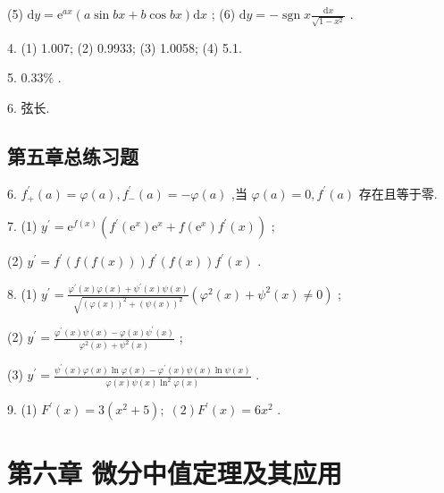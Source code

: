 (5) \(\mathrm{d}y = {\mathrm{e}}^{ax}\left( {a\sin {bx} + b\cos {bx}}\right) \mathrm{d}x\) ; (6) \(\mathrm{d}y =  - \operatorname{sgn}x\frac{\mathrm{d}x}{\sqrt{1 - {x}^{2}}}\) .

4. (1) 1.007; (2) 0.9933; (3) 1.0058; (4) 5.1.

5. \({0.33}\%\) .

6. 弦长.

\subsection{第五章总练习题}

6. \({f}_{ + }^{\prime }\left( a\right)  = \varphi \left( a\right) ,{f}_{ - }^{\prime }\left( a\right)  =  - \varphi \left( a\right)\) ,当 \(\varphi \left( a\right)  = 0,{f}^{\prime }\left( a\right)\) 存在且等于零.

7. (1) \({y}^{\prime } = {\mathrm{e}}^{f\left( x\right) }\left( {{f}^{\prime }\left( {\mathrm{e}}^{x}\right) {\mathrm{e}}^{x} + f\left( {\mathrm{e}}^{x}\right) {f}^{\prime }\left( x\right) }\right)\) ;

(2) \({y}^{\prime } = {f}^{\prime }\left( {f\left( {f\left( x\right) }\right) }\right) {f}^{\prime }\left( {f\left( x\right) }\right) {f}^{\prime }\left( x\right)\) .

8. (1) \({y}^{\prime } = \frac{{\varphi }^{\prime }\left( x\right) \varphi \left( x\right)  + {\psi }^{\prime }\left( x\right) \psi \left( x\right) }{\sqrt{{\left( \varphi \left( x\right) \right) }^{2} + {\left( \psi \left( x\right) \right) }^{2}}}\left( {{\varphi }^{2}\left( x\right)  + {\psi }^{2}\left( x\right)  \neq  0}\right)\) ;

(2) \({y}^{\prime } = \frac{{\varphi }^{\prime }\left( x\right) \psi \left( x\right)  - \varphi \left( x\right) {\psi }^{\prime }\left( x\right) }{{\varphi }^{2}\left( x\right)  + {\psi }^{2}\left( x\right) }\) ;

(3) \({y}^{\prime } = \frac{{\psi }^{\prime }\left( x\right) \varphi \left( x\right) \ln \varphi \left( x\right)  - {\varphi }^{\prime }\left( x\right) \psi \left( x\right) \ln \psi \left( x\right) }{\varphi \left( x\right) \psi \left( x\right) {\ln }^{2}\varphi \left( x\right) }\) .

9. (1) \({F}^{\prime }\left( x\right)  = 3\left( {{x}^{2} + 5}\right) ;\;\left( 2\right) {F}^{\prime }\left( x\right)  = 6{x}^{2}\) .

\section{第六章 微分中值定理及其应用}

